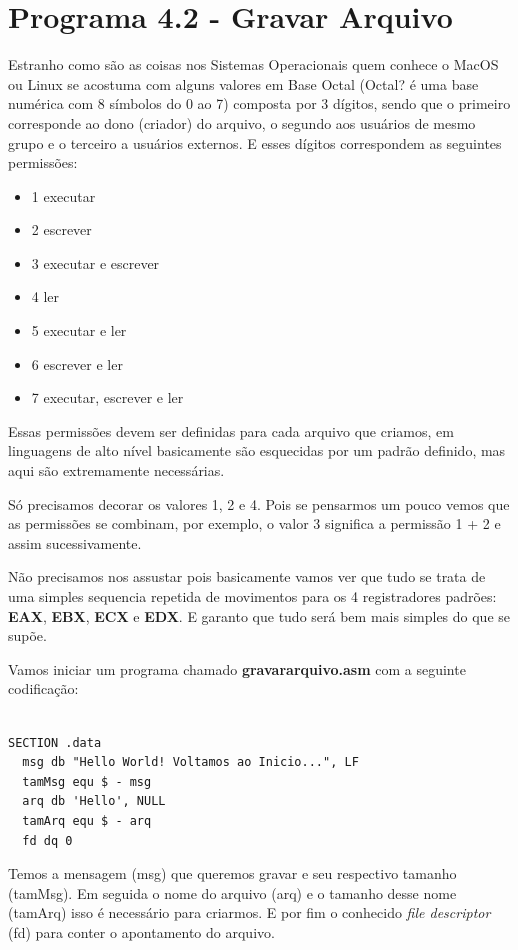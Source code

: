 \section{Programa 4.2 - Gravar Arquivo}
Estranho como são as coisas nos Sistemas Operacionais quem conhece o MacOS ou Linux se acostuma com alguns valores em Base Octal (Octal? é uma base numérica com 8 símbolos do 0 ao 7) composta por 3 dígitos, sendo que o primeiro corresponde ao dono (criador) do arquivo, o segundo aos usuários de mesmo grupo e o terceiro a usuários externos. E esses dígitos correspondem as seguintes permissões:
\begin{itemize}[nolistsep]
	\item 1 executar
	\item 2 escrever
	\item 3 executar e escrever
	\item 4 ler
	\item 5 executar e ler
	\item 6 escrever e ler
	\item 7 executar, escrever e ler
\end{itemize}

Essas permissões devem ser definidas para cada arquivo que criamos, em linguagens de alto nível basicamente são esquecidas por um padrão definido, mas aqui são extremamente necessárias.
\\[2mm]
\begin{dica}[Na verdade]
Só precisamos decorar os valores 1, 2 e 4. Pois se pensarmos um pouco vemos que as permissões se combinam, por exemplo, o valor 3 significa a permissão 1 + 2 e assim sucessivamente.
\end{dica}

Não precisamos nos assustar pois basicamente vamos ver que tudo se trata de uma simples sequencia repetida de movimentos para os 4 registradores padrões: \textbf{EAX}, \textbf{EBX}, \textbf{ECX} e \textbf{EDX}. E garanto que tudo será bem mais simples do que se supõe.

Vamos iniciar um programa chamado \textbf{gravararquivo.asm} com a seguinte codificação:
\begin{lstlisting}[]
%include 'bibliotecaE.inc'

SECTION .data
  msg db "Hello World! Voltamos ao Inicio...", LF
  tamMsg equ $ - msg
  arq db 'Hello', NULL
  tamArq equ $ - arq
  fd dq 0
\end{lstlisting}	

Temos a mensagem (msg) que queremos gravar e seu respectivo tamanho (tamMsg). Em seguida o nome do arquivo (arq) e o tamanho desse nome (tamArq) isso é necessário para criarmos. E por fim o conhecido \textit{file descriptor} (fd) para conter o apontamento do arquivo.

